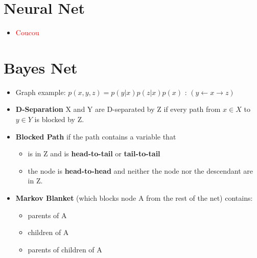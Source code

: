 
\section{Neural Net}
\begin{itemize}
	\item \textcolor{red}{Coucou}
\end{itemize}



\section{Bayes Net}
\begin{itemize}
	\item Graph example: $p(x, y, z) = p(y | x) p(z | x) p(x)$ : $(y \leftarrow x \rightarrow z)$ 
	\item \textbf{D-Separation} X and Y are D-separated by Z if every path from $ x \in X$ to $y \in Y$ is blocked by Z.
	\item \textbf{Blocked Path} if the path contains a variable that
	\begin{itemize}
		\item is in Z and is \textbf{head-to-tail} or \textbf{tail-to-tail}
		\item the node is \textbf{head-to-head} and neither the node nor the descendant are in Z.
	\end{itemize}	
	\item \textbf{Markov Blanket} (which blocks node A from the rest of the net) contains:
	\begin{itemize}
		\item parents of A
		\item children of A
		\item parents of children of A
	\end{itemize}
	
\end{itemize}






